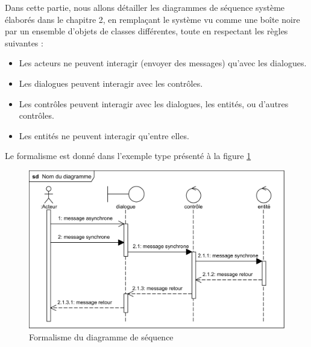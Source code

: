\begin{itemize}
    Dans cette partie, nous allons détailler les diagrammes de séquence système élaborés dans le chapitre 2, en remplaçant le système vu comme une boîte noire par un ensemble d’objets de classes différentes, toute en respectant les règles suivantes :
        \begin{itemize}
            \item[\textbullet] Les acteurs ne peuvent interagir (envoyer des messages) qu’avec les
            dialogues.
            \item[\textbullet] Les dialogues peuvent interagir avec les contrôles. 
            \item[\textbullet] Les contrôles peuvent interagir avec les dialogues, les entités, ou
            d’autres contrôles.
            \item[\textbullet] Les entités ne peuvent interagir qu’entre elles.             
        \end{itemize}
    Le formalisme est donné dans l’exemple type présenté à la figure \ref{fig33}\\
            \begin{figure}[h!]
                 \centering                 \includegraphics[scale=1.23]{images/exemple ds.png}
                 \caption{Formalisme du diagramme de séquence}
                 \label{fig33}
            \end{figure}
    \clearpage
    

\end{itemize}
